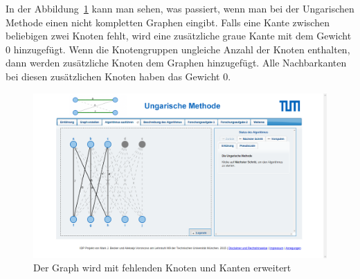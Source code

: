 In der Abbildung~\ref{fig:hungarian-complete} kann man sehen, was passiert, wenn man bei der Ungarischen Methode einen nicht kompletten Graphen eingibt. Falls eine Kante zwischen beliebigen zwei Knoten fehlt, wird eine zusätzliche graue Kante mit dem Gewicht 0 hinzugefügt. Wenn die Knotengruppen ungleiche Anzahl der Knoten enthalten, dann werden zusätzliche Knoten dem Graphen hinzugefügt. Alle Nachbarkanten bei diesen zusätzlichen Knoten haben das Gewicht 0.
\begin{figure}[h!]
	\centering
	\includegraphics[width=\textwidth]{figures/hungarian-complete}
	\caption[Ungarische Methode]{Der Graph wird mit fehlenden Knoten und Kanten erweitert}\label{fig:hungarian-complete}
\end{figure}

